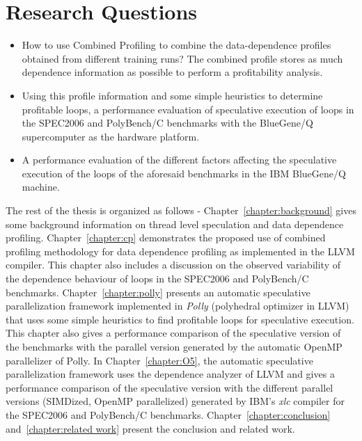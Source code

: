 \documentclass[10pt]{report}          %
\begin{document}
\section{Research Questions}
\begin{itemize}
\item How to use Combined Profiling to combine the data-dependence profiles obtained from different training runs?  The combined profile stores as much dependence information as possible to perform a profitability analysis.
\item Using this profile information and some simple heuristics to determine profitable loops, a performance evaluation of speculative execution of loops in the SPEC2006 and PolyBench/C benchmarks with the BlueGene/Q supercomputer as the hardware platform.
\item A performance evaluation of the different factors affecting the speculative execution of the loops of the aforesaid benchmarks in the IBM BlueGene/Q machine.
\end{itemize}

The rest of the thesis is organized as follows - Chapter~\ref{chapter:background} gives some background information on thread level speculation and data dependence profiling.  Chapter~\ref{chapter:cp} demonstrates the proposed use of combined profiling methodology for data dependence profiling as implemented in the LLVM compiler.  This chapter also includes a discussion on the observed variability of the dependence behaviour of loops in the SPEC2006 and PolyBench/C benchmarks.  Chapter~\ref{chapter:polly} presents an automatic speculative parallelization framework implemented in \textit{Polly} (polyhedral optimizer in LLVM) that uses some simple heuristics to find profitable loops for speculative execution.  This chapter also gives a performance comparison of the speculative version of the benchmarks with the parallel version generated by the automatic OpenMP parallelizer of Polly.  In Chapter~\ref{chapter:O5}, the automatic speculative parallelization framework uses the dependence analyzer of LLVM and gives a performance comparison of the speculative version with the different parallel versions (SIMDized, OpenMP parallelized) generated by IBM's \textit{xlc} compiler for the SPEC2006 and PolyBench/C benchmarks.  Chapter~\ref{chapter:conclusion} and~\ref{chapter:related work} present the conclusion and related work.
\end{document}
